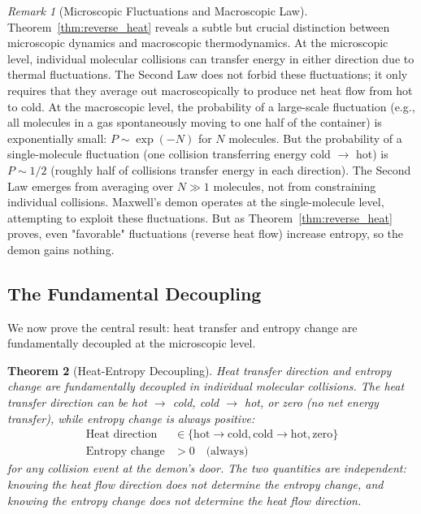 \documentclass[12pt,a4paper]{article}
\newtheorem{theorem}{Theorem}[section]
\theoremstyle{definition}
\theoremstyle{remark}
\newtheorem{remark}[theorem]{Remark}
\begin{document}
\begin{remark}[Microscopic Fluctuations and Macroscopic Law]
\label{rem:fluctuations_law}
Theorem~\ref{thm:reverse_heat} reveals a subtle but crucial distinction between microscopic dynamics and macroscopic thermodynamics. At the microscopic level, individual molecular collisions can transfer energy in either direction due to thermal fluctuations. The Second Law does not forbid these fluctuations; it only requires that they average out macroscopically to produce net heat flow from hot to cold. At the macroscopic level, the probability of a large-scale fluctuation (e.g., all molecules in a gas spontaneously moving to one half of the container) is exponentially small: $P \sim \exp(-N)$ for $N$ molecules. But the probability of a single-molecule fluctuation (one collision transferring energy cold $\to$ hot) is $P \sim 1/2$ (roughly half of collisions transfer energy in each direction). The Second Law emerges from averaging over $N \gg 1$ molecules, not from constraining individual collisions. Maxwell's demon operates at the single-molecule level, attempting to exploit these fluctuations. But as Theorem~\ref{thm:reverse_heat} proves, even "favorable" fluctuations (reverse heat flow) increase entropy, so the demon gains nothing.
\end{remark}

\subsection{The Fundamental Decoupling}

We now prove the central result: heat transfer and entropy change are fundamentally decoupled at the microscopic level.

\begin{theorem}[Heat-Entropy Decoupling]
\label{thm:heat_entropy_decoupling}
Heat transfer direction and entropy change are fundamentally decoupled in individual molecular collisions. The heat transfer direction can be hot $\to$ cold, cold $\to$ hot, or zero (no net energy transfer), while entropy change is always positive:
\begin{align}
\text{Heat direction} &\in \{\text{hot} \to \text{cold}, \text{cold} \to \text{hot}, \text{zero}\} \label{eq:heat_direction} \\
\text{Entropy change} &> 0 \quad \text{(always)} \label{eq:entropy_always_positive}
\end{align}
for any collision event at the demon's door. The two quantities are independent: knowing the heat flow direction does not determine the entropy change, and knowing the entropy change does not determine the heat flow direction.
\end{theorem}
\end{document}
